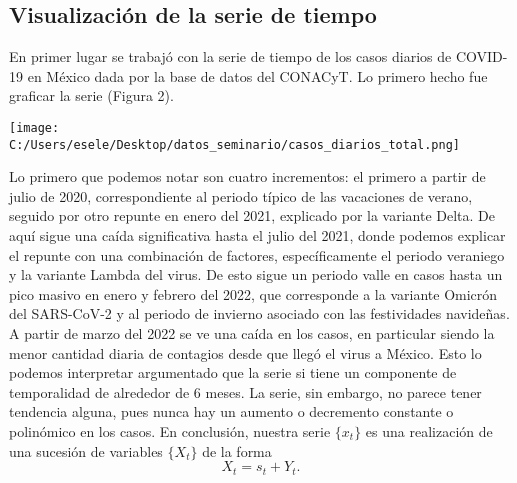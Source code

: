 \documentclass[11pt,letterpaper]{article}
\theoremstyle{definition}
\theoremstyle{theorem}
\theoremstyle{remark}
\begin{document}
	\subsection{Visualización de la serie de tiempo}
	\noindent En primer lugar se trabajó con la serie de tiempo de los casos diarios de COVID-19 en México dada por la base de datos del CONACyT\autocite{web:conacyt}. Lo primero hecho fue graficar la serie (Figura 2).
	\begin{center}
		\texttt{[image: C:/Users/esele/Desktop/datos\_seminario/casos\_diarios\_total.png]}
	\end{center}
	\indent Lo primero que podemos notar son cuatro incrementos: el primero a partir de julio de 2020, correspondiente al periodo típico de las vacaciones de verano, seguido por otro repunte en enero del 2021, explicado por la variante Delta. De aquí sigue una caída significativa hasta el julio del 2021, donde podemos explicar el repunte con una combinación de factores, específicamente el periodo veraniego y la variante Lambda del virus. De esto sigue un periodo valle en casos hasta un pico masivo en enero y febrero del 2022, que corresponde a la variante Omicrón del SARS-CoV-2 y al periodo de invierno asociado con las festividades navideñas. A partir de marzo del 2022 se ve una caída en los casos, en particular siendo la menor cantidad diaria de contagios desde que llegó el virus a México. Esto lo podemos interpretar argumentado que la serie si tiene un componente de temporalidad de alrededor de 6 meses. La serie, sin embargo, no parece tener tendencia alguna, pues nunca hay un aumento o decremento constante o polinómico en los casos. En conclusión, nuestra serie \(\{x_t\}\) es una realización de una sucesión de variables \(\{X_t\}\) de la forma \[X_t=s_t+Y_t.\]
\end{document}
